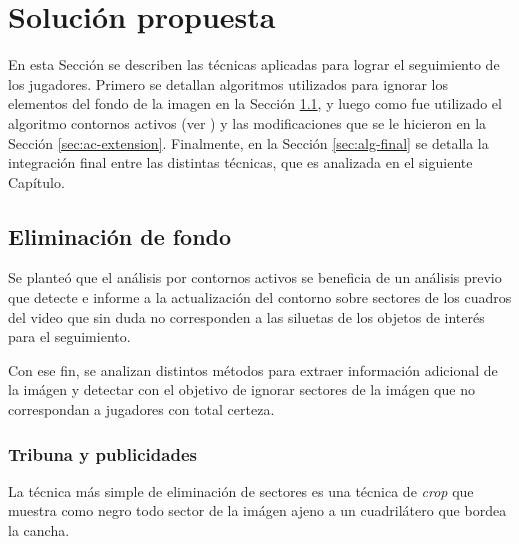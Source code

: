 \chapter{Solución propuesta}
\label{chap-solution}

En esta Sección se describen las técnicas aplicadas para lograr el seguimiento
de los jugadores. Primero se detallan algoritmos utilizados para ignorar los
elementos del fondo de la imagen en la Sección
\ref{sec:background-elimination}, y luego como fue utilizado el algoritmo
contornos activos (ver \cite{fast-level-set}) y las modificaciones que se le
hicieron en la Sección \ref{sec:ac-extension}. Finalmente, en la Sección
\ref{sec:alg-final} se detalla la integración final entre las distintas
técnicas, que es analizada en el siguiente Capítulo.

\section{Eliminación de fondo}

\label{sec:background-elimination}
Se planteó que el análisis por contornos activos se beneficia de un análisis
previo que detecte e informe a la actualización del contorno sobre sectores de
los cuadros del video que sin duda no corresponden a las siluetas de los
objetos de interés para el seguimiento.

Con ese fin, se analizan distintos métodos para extraer información adicional
de la imágen y detectar con el objetivo de ignorar sectores de la imágen que
no correspondan a jugadores con total certeza.

\subsection{Tribuna y publicidades}
\label{subsec:crop-tribunas}

La técnica más simple de eliminación de sectores es una técnica de
\textit{crop} que muestra como negro todo sector de la imágen ajeno a un
cuadrilátero que bordea la cancha.

